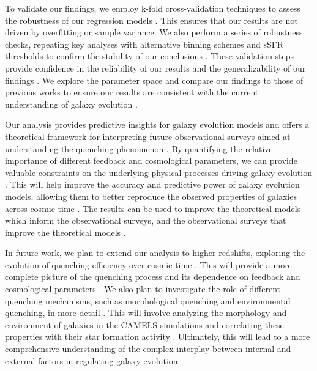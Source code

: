 \documentclass[twocolumn]{aastex631}
\begin{document}
To validate our findings, we employ k-fold cross-validation techniques to assess the robustness of our regression models  \citep{narkedimilli2024predictingstellarmetallicitycomparative}. This ensures that our results are not driven by overfitting or sample variance. We also perform a series of robustness checks, repeating key analyses with alternative binning schemes and sSFR thresholds to confirm the stability of our conclusions  \citep{martin2024robustbayesianregressionastronomy,martin2024robustbayesianregressionastronomy}. These validation steps provide confidence in the reliability of our results and the generalizability of our findings  \citep{narkedimilli2024predictingstellarmetallicitycomparative,martin2024robustbayesianregressionastronomy,martin2024robustbayesianregressionastronomy}. We explore the parameter space and compare our findings to those of previous works to ensure our results are consistent with the current understanding of galaxy evolution  \citep{stoppa2023consistencytestscomparingastrophysical}.

Our analysis provides predictive insights for galaxy evolution models and offers a theoretical framework for interpreting future observational surveys aimed at understanding the quenching phenomenon  \citep{schawinski2018exploringgalaxyevolutiongenerative}. By quantifying the relative importance of different feedback and cosmological parameters, we can provide valuable constraints on the underlying physical processes driving galaxy evolution  \citep{lapi2025semiempiricalmodelsgalaxyformation}. This will help improve the accuracy and predictive power of galaxy evolution models, allowing them to better reproduce the observed properties of galaxies across cosmic time  \citep{li2024usinggalaxyevolutionsource}. The results can be used to improve the theoretical models which inform the observational surveys, and the observational surveys that improve the theoretical models  \citep{comparat2025crosscorrelationsoftxraysgalaxies}.

In future work, we plan to extend our analysis to higher redshifts, exploring the evolution of quenching efficiency over cosmic time \citep{mao2022revealingimpactsstellarmass,bravo2023galaxyquenchingtimescalesforensic}. This will provide a more complete picture of the quenching process and its dependence on feedback and cosmological parameters \citep{dou2025criticalroledarkmatter}. We also plan to investigate the role of different quenching mechanisms, such as morphological quenching and environmental quenching, in more detail \citep{mao2022revealingimpactsstellarmass,ellison2024galaxyevolutionpostmergerregime}. This will involve analyzing the morphology and environment of galaxies in the CAMELS simulations and correlating these properties with their star formation activity \citep{mao2022revealingimpactsstellarmass,bravo2023galaxyquenchingtimescalesforensic,ellison2024galaxyevolutionpostmergerregime}. Ultimately, this will lead to a more comprehensive understanding of the complex interplay between internal and external factors in regulating galaxy evolution.
\end{document}
